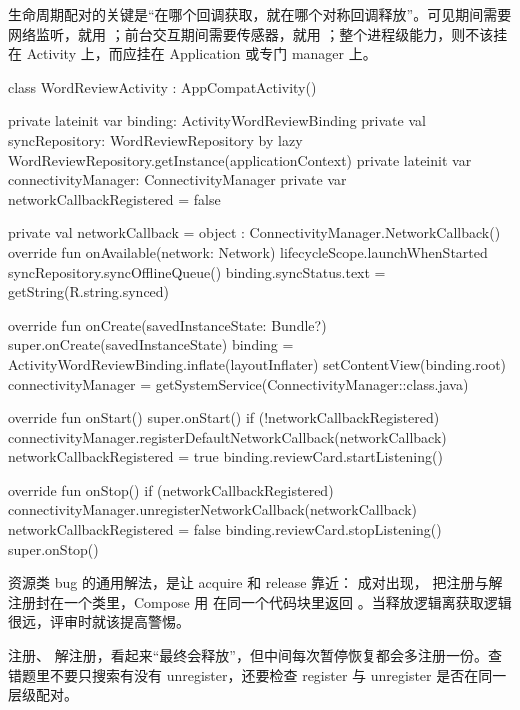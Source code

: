 生命周期配对的关键是“在哪个回调获取，就在哪个对称回调释放”。可见期间需要网络监听，就用 ；前台交互期间需要传感器，就用 ；整个进程级能力，则不该挂在 Activity 上，而应挂在 Application 或专门 manager 上。

\begin{ktfix}
class WordReviewActivity : AppCompatActivity() {
    private lateinit var binding: ActivityWordReviewBinding
    private val syncRepository: WordReviewRepository by lazy { WordReviewRepository.getInstance(applicationContext) }
    private lateinit var connectivityManager: ConnectivityManager
    private var networkCallbackRegistered = false

    private val networkCallback = object : ConnectivityManager.NetworkCallback() {
        override fun onAvailable(network: Network) {
            lifecycleScope.launchWhenStarted {
                syncRepository.syncOfflineQueue()
                binding.syncStatus.text = getString(R.string.synced)
            }
        }
    }

    override fun onCreate(savedInstanceState: Bundle?) {
        super.onCreate(savedInstanceState)
        binding = ActivityWordReviewBinding.inflate(layoutInflater)
        setContentView(binding.root)
        connectivityManager = getSystemService(ConnectivityManager::class.java)
    }

    override fun onStart() {
        super.onStart()
        if (!networkCallbackRegistered) {
            connectivityManager.registerDefaultNetworkCallback(networkCallback)
            networkCallbackRegistered = true
        }
        binding.reviewCard.startListening()
    }

    override fun onStop() {
        if (networkCallbackRegistered) {
            connectivityManager.unregisterNetworkCallback(networkCallback)
            networkCallbackRegistered = false
        }
        binding.reviewCard.stopListening()
        super.onStop()
    }
}
\end{ktfix}

\begin{idea}[获取与释放要在语法上相邻]
资源类 bug 的通用解法，是让 acquire 和 release 靠近： 成对出现， 把注册与解注册封在一个类里，Compose 用  在同一个代码块里返回 。当释放逻辑离获取逻辑很远，评审时就该提高警惕。
\end{idea}

\begin{pitfall}[生命周期不配对比完全不释放更隐蔽]
 注册、 解注册，看起来“最终会释放”，但中间每次暂停恢复都会多注册一份。查错题里不要只搜索有没有 unregister，还要检查 register 与 unregister 是否在同一层级配对。
\end{pitfall}

